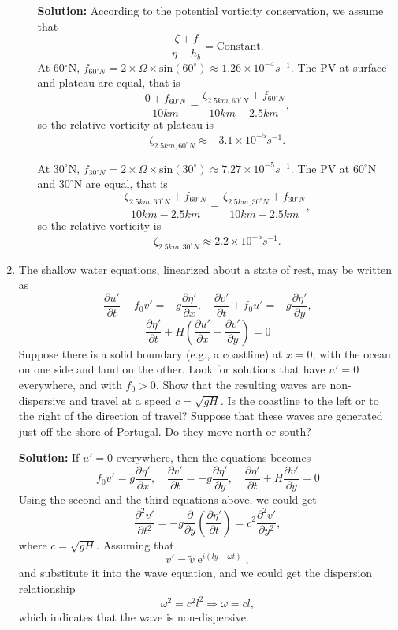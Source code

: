 \documentclass[a4paper]{article}
\begin{document}
\begin{enumerate}[label=\textbf{\arabic*.}]
\begin{enumerate}[label=(\alph*)]
		\textbf{Solution:} According to the potential vorticity conservation,
		we assume that $$\frac{\zeta+f}{\eta-h_b}=\text{Constant}.$$
		At  60$^\circ$N, $f_{ 60^\circ N}=2\times \Omega \times \text{sin}(60^{\circ})\approx 1.26\times 10^{-4}s^{-1}.$ The PV at surface and plateau are equal, that is
		$$\frac{0+f_{ 60^\circ N}}{10km}=\frac{\zeta_{2.5km, 60^\circ N} +f_{ 60^\circ N}}{10km-2.5km},$$
		so the relative vorticity at plateau is
		$$\zeta_{2.5km, 60^\circ N}\approx -3.1\times 10^{-5} s^{-1}.$$
		
		At $30^\circ$N, $f_{ 30^\circ N}=2\times \Omega \times \text{sin}(30^{\circ})\approx 7.27\times 10^ {-5}s^{-1}.$ The PV at $60^\circ$N and $30^\circ$N are equal, that is
		$$\frac{\zeta_{2.5km, 60^\circ N}+f_{60^\circ N}}{10km-2.5km}=\frac{\zeta_{2.5km, 30^\circ N} +f_{30^\circ N}}{10km-2.5km},$$
		so the relative vorticity is
		$$\zeta_{2.5km, 30^\circ N} \approx 2.2\times 10^{-5}s^{-1}.$$
		\end{enumerate}

	\setcounter{enumi}{5}
	\item The shallow water equations, linearized about a state of rest, may be written as
	$$\frac{\partial u'}{\partial t}-f_0v'=-g\frac{\partial \eta'}{\partial x}, \quad \frac{\partial v'}{\partial t}+f_0u'=-g\frac{\partial \eta'}{\partial y},$$
	$$\frac{\partial \eta '}{\partial t} + H \left(\frac{\partial u'}{\partial x}+\frac{\partial v'}{\partial y}\right)=0$$
	Suppose there is a solid boundary (e.g., a coastline) at $x = 0$, with the ocean on one side and land on the other. Look for solutions that have $u'=0$ everywhere, and with $f_0 > 0$. Show that the resulting waves are non-dispersive and travel at a speed $c=\sqrt{gH}$. Is the coastline to the left or to the right of the direction of travel? Suppose that these waves are generated just off the shore of Portugal. Do they move north or south?
	
	\textbf{Solution:} If $u'=0$ everywhere, then the equations becomes 
		$$f_0v'=g\frac{\partial \eta'}{\partial x}, \quad \frac{\partial v'}{\partial t}=-g\frac{\partial \eta'}{\partial y},\quad \frac{\partial \eta '}{\partial t} +H \frac{\partial v'}{\partial y}=0$$
	Using the second and the third equations above, we could get
	$$ \frac{\partial^2 v'}{\partial t^2} = -g\frac{\partial}{\partial y }\left(\frac{\partial \eta '}{\partial t}\right)=c^2\frac{\partial^2 v '}{\partial y^2},$$
	where $c=\sqrt{gH}.$
	Assuming that $$v'=\tilde{v}\operatorname{e}^{i(ly-\omega t)},$$
	and substitute it into the wave equation, and we could get the dispersion relationship
	$$\omega ^2 =c^2l^2\Longrightarrow \omega = cl,$$
	which indicates that the wave is non-dispersive.
	

\end{enumerate}
\end{document}
